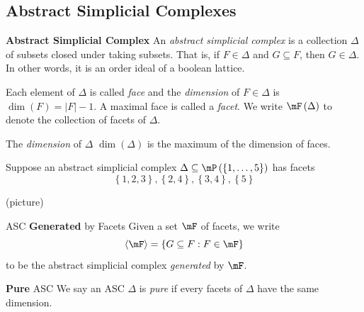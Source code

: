 \documentclass[co439]{subfiles}
\begin{document}
    \rruleline

    \clearpage

    \subsection{Abstract Simplicial Complexes}
    
    \begin{definition}{\textbf{Abstract Simplicial Complex}}
        An \emph{abstract simplicial complex} is a collection $\Delta$ of subsets closed under taking subsets. That is, if $F\in\Delta$ and $G\subseteq F$, then $G\in\Delta$. In other words, it is an order ideal of a boolean lattice.

        Each element of $\Delta$ is called \emph{face} and the \emph{dimension} of $F\in\Delta$ is $\dim\left( F \right) = \left| F \right|-1$. A maximal face is called a \emph{facet}. We write $\mF\left( \Delta \right)$ to denote the collection of facets of $\Delta$.

        The \emph{dimension} of $\Delta$ $\dim\left( \Delta \right)$ is the maximum of the dimension of faces.
    \end{definition}

    \begin{example}{}
        Suppose an abstract simplicial complex $\Delta\subseteq\mP\left( \left\lbrace 1,\ldots,5 \right\rbrace \right)$ has facets
        \begin{equation*}
            \left\lbrace 1,2,3 \right\rbrace, \left\lbrace 2,4 \right\rbrace, \left\lbrace 3,4 \right\rbrace, \left\lbrace 5 \right\rbrace
        \end{equation*}

        \begin{center}
            (picture)
        \end{center}
    \end{example}

    \rruleline

    \begin{definition}{ASC \textbf{Generated} by Facets}
        Given a set $\mF$ of facets, we write
        \begin{equation*}
            \left< \mF \right> = \left\lbrace G\subseteq F: F\in\mF \right\rbrace 
        \end{equation*}
        to be the abstract simplicial complex \emph{generated} by $\mF$.
    \end{definition}

    \begin{definition}{\textbf{Pure} ASC}
        We say an ASC $\Delta$ is \emph{pure} if every facets of $\Delta$ have the same dimension.
    \end{definition}
\end{document}
